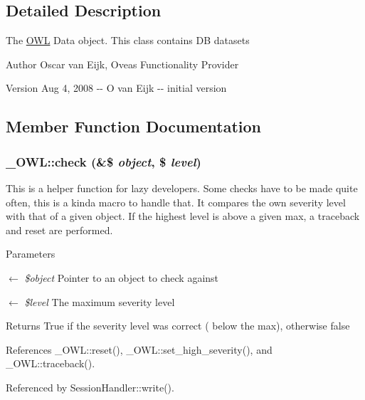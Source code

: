 \subsection{Detailed Description}
The \hyperlink{classOWL}{OWL} Data object. This class contains DB datasets \begin{DoxyAuthor}{Author}
Oscar van Eijk, Oveas Functionality Provider 
\end{DoxyAuthor}
\begin{DoxyVersion}{Version}
Aug 4, 2008 -\/-\/ O van Eijk -\/-\/ initial version 
\end{DoxyVersion}


\subsection{Member Function Documentation}
\subsubsection[{check}]{\setlength{\rightskip}{0pt plus 5cm}\_\-OWL::check (\&\$ {\em object}, \/  \$ {\em level})}\label{class__OWL_ad6f4f6946f40199dd0333cf219fa500e}
This is a helper function for lazy developers. Some checks have to be made quite often, this is a kinda macro to handle that. It compares the own severity level with that of a given object. If the highest level is above a given max, a traceback and reset are performed.


\begin{DoxyParams}{Parameters}
\item[\mbox{$\leftarrow$} {\em \$object}]Pointer to an object to check against \item[\mbox{$\leftarrow$} {\em \$level}]The maximum severity level \end{DoxyParams}
\begin{DoxyReturn}{Returns}
True if the severity level was correct ( below the max), otherwise false 
\end{DoxyReturn}


References \_\-OWL::reset(), \_\-OWL::set\_\-high\_\-severity(), and \_\-OWL::traceback().



Referenced by SessionHandler::write().

